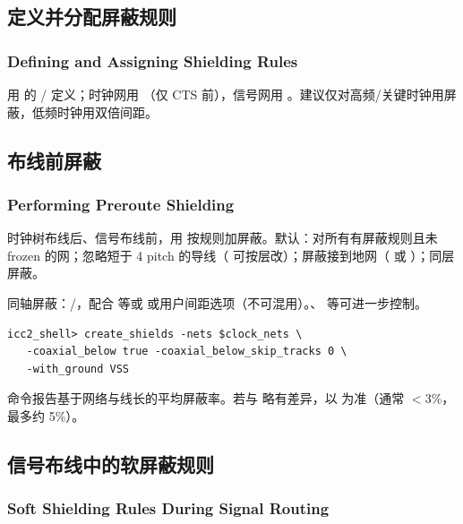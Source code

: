 \subsection{定义并分配屏蔽规则}
\subsubsection*{Defining and Assigning Shielding Rules}

用  的 / 定义；时钟网用 （仅 CTS 前），信号网用 。建议仅对高频/关键时钟用屏蔽，低频时钟用双倍间距。

\subsection{布线前屏蔽}
\subsubsection*{Performing Preroute Shielding}

时钟树布线后、信号布线前，用  按规则加屏蔽。默认：对所有有屏蔽规则且未 frozen 的网；忽略短于 4 pitch 的导线（ 可按层改）；屏蔽接到地网（ 或 ）；同层屏蔽。

同轴屏蔽：/，配合  等或  或用户间距选项（不可混用）。、 等可进一步控制。

\begin{lstlisting}
icc2_shell> create_shields -nets $clock_nets \
   -coaxial_below true -coaxial_below_skip_tracks 0 \
   -with_ground VSS
\end{lstlisting}

命令报告基于网络与线长的平均屏蔽率。若与  略有差异，以  为准（通常 $<$3\%，最多约 5\%）。

\subsection{信号布线中的软屏蔽规则}
\subsubsection*{Soft Shielding Rules During Signal Routing}

